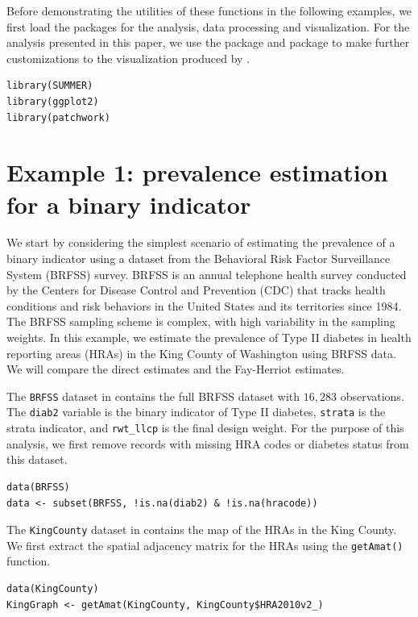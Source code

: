 Before demonstrating the utilities of these functions in the following examples, we first load the packages for the analysis, data processing and visualization. For the analysis presented in this paper, we use the  package \citep{wickham_ggplot2} and  package \citep{patchwork} to make further customizations to the visualization produced by .

\begin{verbatim}
library(SUMMER)
library(ggplot2)
library(patchwork)
\end{verbatim}

\section{Example 1: prevalence estimation for a binary indicator}\label{example-1-prevalence-estimation-for-a-binary-indicator}

We start by considering the simplest scenario of estimating the prevalence of a binary indicator using a dataset from the Behavioral Risk Factor Surveillance System (BRFSS) survey. BRFSS is an annual telephone health survey conducted by the Centers for Disease Control and Prevention (CDC) that tracks health conditions and risk behaviors in the United States and its territories since 1984. The BRFSS sampling scheme is complex, with high variability in the sampling weights. In this example, we estimate the prevalence of Type II diabetes in health reporting areas (HRAs) in the King County of Washington using BRFSS data. We will compare the direct estimates and the Fay-Herriot estimates.

The \texttt{BRFSS} dataset in  contains the full BRFSS dataset with \(16,283\) observations. The \texttt{diab2} variable is the binary indicator of Type II diabetes, \texttt{strata} is the strata indicator, and \texttt{rwt\_llcp} is the final design weight. For the purpose of this analysis, we first remove records with missing HRA codes or diabetes status from this dataset.

\begin{verbatim}
data(BRFSS)
data <- subset(BRFSS, !is.na(diab2) & !is.na(hracode))
\end{verbatim}

The \texttt{KingCounty} dataset in  contains the map of the HRAs in the King County. We first extract the spatial adjacency matrix for the HRAs using the \texttt{getAmat()} function.

\begin{verbatim}
data(KingCounty)
KingGraph <- getAmat(KingCounty, KingCounty$HRA2010v2_)
\end{verbatim}

